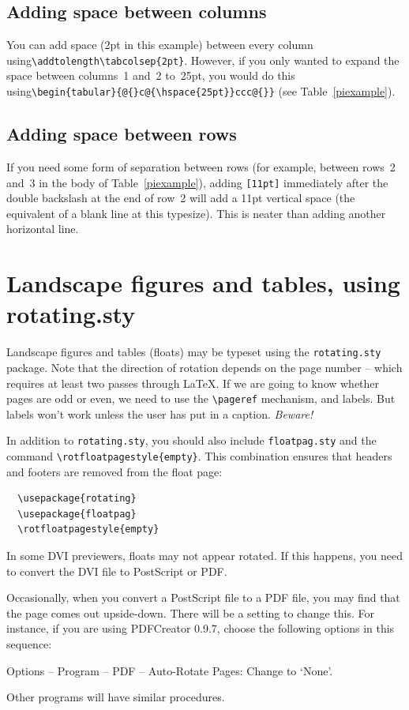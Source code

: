 \subsection{Adding space between columns}
\label{addhoriz}
You can add space (2pt in this example) between every column using\linebreak \verb"\addtolength\tabcolsep{2pt}". However, if you only wanted to expand the space between columns~1 and~2 to~25pt, you would do this using\linebreak \verb"\begin{tabular}{@{}c@{\hspace{25pt}}ccc@{}}" (see Table~\ref{piexample}).

\subsection{Adding space between rows}
If you need some form of separation between rows (for example, between rows~2 and~3 in the body of Table~\ref{piexample}), adding \verb"[11pt]" immediately after the double backslash at the end of row~2 will add a 11pt vertical space (the equivalent of a blank line at this typesize). This is neater than adding another horizontal line.


\section{Landscape figures and tables, using rotating.sty}

Landscape figures and tables (floats) may be typeset using the \verb"rotating.sty" package. Note that the direction of rotation depends on the page number -- which requires at least two passes through \LaTeX. If we are going to know whether pages are odd or even, we need to use the \verb"\pageref" mechanism, and labels. But labels won't work unless the user has put in a caption. \textit{Beware!}

In addition to \verb"rotating.sty", you should also include \verb"floatpag.sty" and the command \verb"\rotfloatpagestyle{empty}". This combination ensures that headers and footers are removed from the float page:
\begin{verbatim}
  \usepackage{rotating}
  \usepackage{floatpag}
  \rotfloatpagestyle{empty}
\end{verbatim}
In some DVI previewers, floats may not appear rotated. If this happens, you need to convert the DVI file to PostScript or PDF.

Occasionally, when you convert a PostScript file to a PDF file, you may find that the page comes out upside-down. There will be a setting to change this. For instance, if you are using PDFCreator 0.9.7, choose the following options in this sequence:
\begin{description}
  \item Options -- Program -- PDF -- Auto-Rotate Pages: Change to `None'.
\end{description}
Other programs will have similar procedures.

